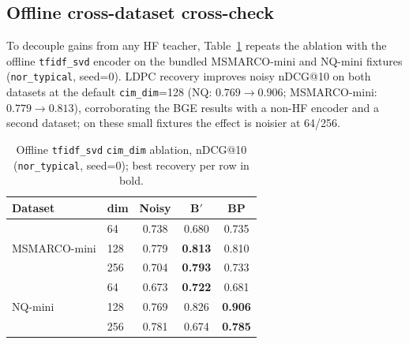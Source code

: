 \documentclass[sigconf,review,anonymous]{acmart}
\begin{document}
\subsection{Offline cross-dataset cross-check}
To decouple gains from any HF teacher, Table~\ref{tab:tfidf} repeats the ablation with the offline \texttt{tfidf\_svd} encoder on the bundled MSMARCO-mini and NQ-mini fixtures (\texttt{nor\_typical}, seed=0).
LDPC recovery improves noisy nDCG@10 on both datasets at the default \texttt{cim\_dim}=128 (NQ: $0.769\rightarrow0.906$; MSMARCO-mini: $0.779\rightarrow0.813$), corroborating the BGE results with a non-HF encoder and a second dataset; on these small fixtures the effect is noisier at 64/256.
\begin{table}[t]
\caption{Offline \texttt{tfidf\_svd} \texttt{cim\_dim} ablation, nDCG@10 (\texttt{nor\_typical}, seed=0); best recovery per row in bold.}
\label{tab:tfidf}
\small
\setlength{\tabcolsep}{4pt}
\begin{tabular}{llccc}
\toprule
Dataset & dim & Noisy & B$'$ & BP \\
\midrule
\multirow{3}{*}{MSMARCO-mini} & 64 & 0.738 & 0.680 & 0.735 \\
 & 128 & 0.779 & \textbf{0.813} & 0.810 \\
 & 256 & 0.704 & \textbf{0.793} & 0.733 \\
\midrule
\multirow{3}{*}{NQ-mini} & 64 & 0.673 & \textbf{0.722} & 0.681 \\
 & 128 & 0.769 & 0.826 & \textbf{0.906} \\
 & 256 & 0.781 & 0.674 & \textbf{0.785} \\
\bottomrule
\end{tabular}
\end{table}
\end{document}
